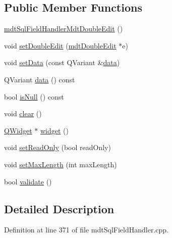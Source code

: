 \subsection*{Public Member Functions}
\begin{DoxyCompactItemize}
\item 
\hyperlink{classmdt_sql_field_handler_mdt_double_edit_a857887e480dfbcbd44368c67502c055d}{mdt\-Sql\-Field\-Handler\-Mdt\-Double\-Edit} ()
\item 
void \hyperlink{classmdt_sql_field_handler_mdt_double_edit_a51657f6dc0d6ad2754724888c77c5641}{set\-Double\-Edit} (\hyperlink{classmdt_double_edit}{mdt\-Double\-Edit} $\ast$e)
\item 
void \hyperlink{classmdt_sql_field_handler_mdt_double_edit_a4b9c206734fd669e81b71ae05bd5e090}{set\-Data} (const Q\-Variant \&\hyperlink{classmdt_sql_field_handler_mdt_double_edit_a2cd035dd532fed80822173e8b2e4cc99}{data})
\item 
Q\-Variant \hyperlink{classmdt_sql_field_handler_mdt_double_edit_a2cd035dd532fed80822173e8b2e4cc99}{data} () const 
\item 
bool \hyperlink{classmdt_sql_field_handler_mdt_double_edit_a17e263b0ba471553e79f0974dda5e296}{is\-Null} () const 
\item 
void \hyperlink{classmdt_sql_field_handler_mdt_double_edit_a42e5788c6807f673e4f0600a89499bc3}{clear} ()
\item 
\hyperlink{class_q_widget}{Q\-Widget} $\ast$ \hyperlink{classmdt_sql_field_handler_mdt_double_edit_a92b09a4317834218f60170317c08aa49}{widget} ()
\item 
void \hyperlink{classmdt_sql_field_handler_mdt_double_edit_ade3026eb59952fe664b86b703d1a606c}{set\-Read\-Only} (bool read\-Only)
\item 
void \hyperlink{classmdt_sql_field_handler_mdt_double_edit_ac621c585a7854de6c80c6eec3d97e6cd}{set\-Max\-Length} (int max\-Length)
\item 
bool \hyperlink{classmdt_sql_field_handler_mdt_double_edit_aaba033287d76b333baeafd64920ac7da}{validate} ()
\end{DoxyCompactItemize}


\subsection{Detailed Description}


Definition at line 371 of file mdt\-Sql\-Field\-Handler.\-cpp.



